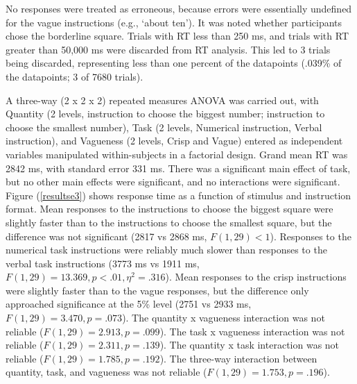 \documentclass[doc,floatmark]{apa}
\begin{document}
No responses were treated as erroneous, because errors were essentially undefined for the vague instructions (e.g., `about ten'). It was noted whether participants chose the borderline square. Trials with RT less than 250 ms, and trials with RT greater than 50,000 ms were discarded from RT analysis. This led to 3 trials being discarded, representing less than one percent of the datapoints (.039\% of the datapoints; 3 of 7680 trials).

A three-way (2 x 2 x 2) repeated measures ANOVA was carried out, with Quantity (2 levels, instruction to choose the biggest number; instruction to choose the smallest number), Task (2 levels, Numerical instruction, Verbal instruction), and Vagueness (2 levels, Crisp and Vague) entered as independent variables manipulated within-subjects in a factorial design. Grand mean RT was 2842 ms, with standard error 331 ms. There was a significant main effect of task, but no other main effects were significant, and no interactions were significant. Figure (\ref{resultse3}) shows response time as a function of stimulus and instruction format. Mean responses to the instructions to choose the biggest square were slightly faster than to the instructions to choose the smallest square, but the difference was not significant (2817 vs 2868 ms, $F(1,29) < 1$). Responses to the numerical  task instructions were reliably much slower than responses to the verbal  task instructions (3773 ms vs 1911 ms, $F(1,29) = 13.369, p<.01, \eta^2 = .316$). Mean responses to the crisp instructions were slightly faster than to the vague responses, but the difference only approached significance at the 5\% level (2751 vs 2933 ms, $F(1,29)=3.470, p=.073$). The quantity x vagueness interaction was not reliable ($F(1,29)=2.913,p=.099$). The task x vagueness interaction was not reliable ($F(1,29)=2.311,p=.139$). The quantity x  task interaction was not reliable ($F(1,29)=1.785,p=.192$). The three-way interaction between quantity, task, and vagueness was not reliable ($F(1,29)=1.753,p=.196$).
\end{document}
